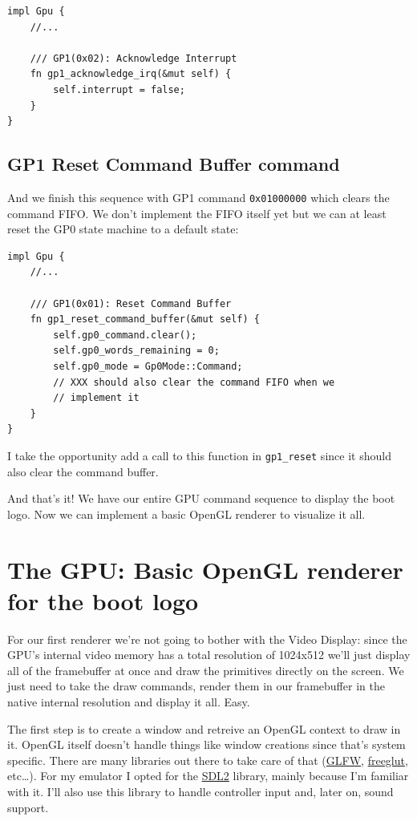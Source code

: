 \documentclass[a4paper]{article}
\newcommand{\code}[1] {\texttt{#1}}
\begin{document}
\begin{lstlisting}
impl Gpu {
    //...

    /// GP1(0x02): Acknowledge Interrupt
    fn gp1_acknowledge_irq(&mut self) {
        self.interrupt = false;
    }
}
\end{lstlisting}

\subsection{GP1 Reset Command Buffer command}

And we finish this sequence with GP1 command \code{0x01000000} which
clears the command FIFO. We don't implement the FIFO itself yet but we
can at least reset the GP0 state machine to a default state:

\begin{lstlisting}
impl Gpu {
    //...

    /// GP1(0x01): Reset Command Buffer
    fn gp1_reset_command_buffer(&mut self) {
        self.gp0_command.clear();
        self.gp0_words_remaining = 0;
        self.gp0_mode = Gp0Mode::Command;
        // XXX should also clear the command FIFO when we
        // implement it
    }
}
\end{lstlisting}

I take the opportunity add a call to this function in
\code{gp1\_reset} since it should also clear the command buffer.

And that's it! We have our entire GPU command sequence to display the
boot logo. Now we can implement a basic OpenGL renderer to visualize
it all.

\section{The GPU: Basic OpenGL renderer for the boot logo}

For our first renderer we're not going to bother with the Video
Display: since the GPU's internal video memory has a total resolution
of 1024x512 we'll just display all of the framebuffer at once and draw
the primitives directly on the screen. We just need to take the draw
commands, render them in our framebuffer in the native internal
resolution and display it all. Easy.

The first step is to create a window and retreive an OpenGL context to
draw in it. OpenGL itself doesn't handle things like window creations
since that's system specific. There are many libraries out there to
take care of that (\href{http://www.glfw.org/}{GLFW},
\href{http://freeglut.sourceforge.net/}{freeglut}, etc\dots{}). For my
emulator I opted for the \href{http://libsdl.org/}{SDL2} library,
mainly because I'm familiar with it. I'll also use this library to
handle controller input and, later on, sound support.
\end{document}

